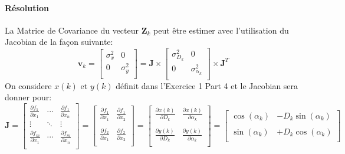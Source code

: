 \documentclass{article}
\begin{document}
\paragraph{Résolution}La Matrice de Covariance \cite{jacobianMatrix} \cite{jacobianMatrixComputation} du vecteur $\mathbf{Z}_{k}$ peut être estimer avec l'utilisation du Jacobian de la façon suivante:
\begin{equation*}
    \mathbf{v}_{k} 
    = 
    \begin{bmatrix}
        \sigma_{x}^2 & 0\\
        0 & \sigma_{y}^2\\
    \end{bmatrix} 
    = 
    \mathbf{J} 
    \times 
    \begin{bmatrix}
        \sigma_{D_{k}}^2 & 0\\
        0 & \sigma_{\alpha_{k}}^2\\
    \end{bmatrix}
    \times 
    \mathbf{J}^{T}
\end{equation*}
On considere $x(k)$ et $y(k)$ définit dans l'Exercice 1 Part 4 et le Jacobian sera donner pour:
\begin{equation*}
    \mathbf{J} = 
    \begin{bmatrix}
        \frac{\partial f_{1}}{\partial x_{1}} & \cdots & \frac{\partial f_{1}}{\partial x_{n}}\\
        \vdots & \ddots & \vdots\\
        \frac{\partial f_{m}}{\partial x_{1}} & \cdots & \frac{\partial f_{m}}{\partial x_{n}}\\
    \end{bmatrix} 
    = 
    \begin{bmatrix}
        \frac{\partial f_{1}}{\partial x_{1}} & \frac{\partial f_{1}}{\partial x_{2}}\\\\
        \frac{\partial f_{2}}{\partial x_{1}} & \frac{\partial f_{2}}{\partial x_{2}}\\
    \end{bmatrix} 
    = 
    \begin{bmatrix}
        \frac{\partial x(k)}{\partial D_{k}} & \frac{\partial x(k)}{\partial \alpha_{k}}\\\\
        \frac{\partial y(k)}{\partial D_{k}} & \frac{\partial y(k)}{\partial \alpha_{k}}\\
    \end{bmatrix} 
    = 
    \begin{bmatrix}
        \cos(\alpha_{k}) & -D_{k} \sin(\alpha_{k})\\\\
        \sin(\alpha_{k}) & +D_{k} \cos(\alpha_{k})\\
    \end{bmatrix}
\end{equation*}
\end{document}
